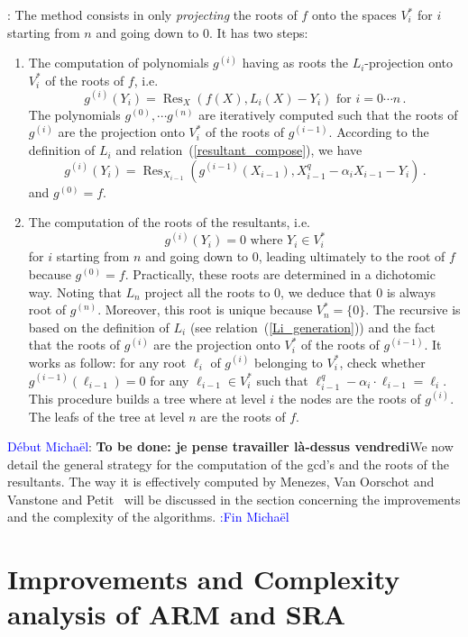 \documentclass{sig-alternate}
\DeclareMathOperator{\Res}{Res}
\newcounter{algo}
\newcommand{\comd}{\noindent \textcolor{blue}{D\'ebut Micha\"el}:}
\newcommand{\comf}{\noindent \textcolor{blue}{:Fin Micha\"el}}
\begin{document}
\medskip

: The method consists in only \emph{projecting} the roots of $f$ onto the spaces $V_i^\ast$ for $i$ starting from $n$ and going down to 0.
It has two steps:
\begin{enumerate}
\item The computation of polynomials $g^{(i)}$ having as roots the $L_i$-projection onto $V_i^\ast$ of the roots of $f$,  i.e.
  $$g^{(i)}(Y_i)=\Res_{X}(f(X), L_i(X)-Y_i )  \mbox{ for }i=0 \cdots n \,.$$
  The polynomials $g^{(0)}, \cdots g^{(n)}$ are iteratively computed such that the roots of $g^{(i)}$ are the projection onto 
  $V_i^\ast$ of the roots of $g^{(i-1)}$. According to the definition of $L_i$ and relation~(\ref{resultant_compose}), we have
  $$g^{(i)}(Y_i)=\Res_{X_{i-1}}(g^{(i-1)}(X_{i-1}),X^q_{i-1} - \alpha_i X_{i-1} -Y_i ) \,.$$
 and $g ^{(0)}=f$.
\item The computation of the roots of the resultants, i.e.
$$g^{(i)}(Y_i)=0  \mbox{ where }  Y_i \in   V_i^\ast$$
for $i$ starting from $n$ and going down to 0, leading ultimately to the root of $f$ because $g^{(0)}=f$. Practically, these roots 
are determined in a dichotomic way. Noting that $L_n$ project all the roots to $0$,
 we deduce that $0$ is always root of $g^{(n)}$. Moreover, this root is unique because $V_n^\ast=\{0\}$.
The recursive is based on the definition of $L_i$ (see relation~(\ref{Li_generation})) and the fact that the roots of $g^{(i)}$ are the projection onto 
  $V_i^\ast$ of the roots of $g^{(i-1)}$. It works as follow: for any root $\ell_i$ of $g^{(i)}$ belonging to $V_i^\ast$, check whether $g^{(i-1)}(\ell_{i-1})=0$
   for any $\ell_{i-1} \in V_i^\ast$ such that $\ell_{i-1}^q-\alpha_i \cdot \ell_{i-1}=\ell_i$. This procedure builds a tree where at level $i$ the nodes are the roots of $g^{(i)}$. 
   The leafs of the tree at level $n$ are the roots of $f$.
\end{enumerate}


\comd
{\bf To be done: je pense travailler l\`a-dessus vendredi}We now detail the general strategy for the computation of the gcd's and the roots of the resultants. The way it is effectively computed by Menezes, Van Oorschot and Vanstone\cite{MOV92} and Petit~\cite{} will be discussed in the section concerning the improvements and the complexity of the algorithms.
\comf



\section{Improvements and Complexity analysis of ARM and SRA}
\end{document}
